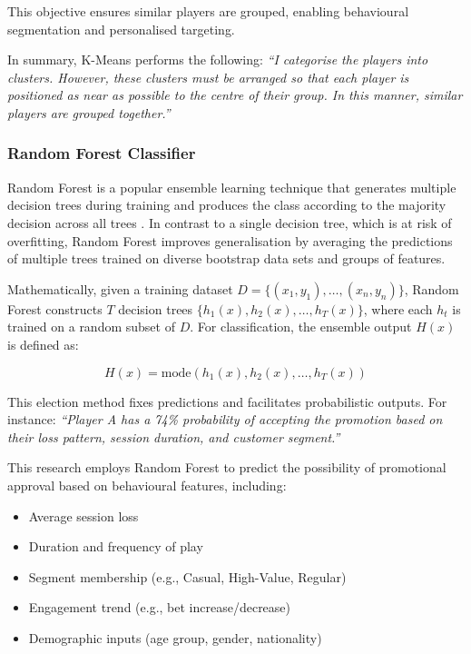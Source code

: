 \documentclass[12pt,a4paper]{report}
\begin{document}
This objective ensures similar players are grouped, enabling behavioural segmentation and personalised targeting.

In summary, K-Means performs the following:
\textit{``I categorise the players into clusters. However, these clusters must be arranged so that each player is positioned as near as possible to the centre of their group. In this manner, similar players are grouped together.''}


\subsubsection{Random Forest Classifier}

Random Forest is a popular ensemble learning technique that generates multiple decision trees during training and produces the class according to the majority decision across all trees \citet{randomforest}.  In contrast to a single decision tree, which is at risk of overfitting, Random Forest improves generalisation by averaging the predictions of multiple trees trained on diverse bootstrap data sets and groups of features.

Mathematically, given a training dataset \( D = \{(x_1, y_1), \dots, (x_n, y_n)\} \), Random Forest constructs \( T \) decision trees \( \{h_1(x), h_2(x), \dots, h_T(x)\} \), where each \( h_t \) is trained on a random subset of \( D \). For classification, the ensemble output \( H(x) \) is defined as:

\[
H(x) = \text{mode}\left( h_1(x), h_2(x), \dots, h_T(x) \right)
\]

This election method fixes predictions and facilitates probabilistic outputs. For instance:  
\textit{``Player A has a 74\% probability of accepting the promotion based on their loss pattern, session duration, and customer segment.''}

This research employs Random Forest to predict the possibility of promotional approval based on behavioural features, including:

\begin{itemize}
    \item Average session loss
    \item Duration and frequency of play
    \item Segment membership (e.g., Casual, High-Value, Regular)
    \item Engagement trend (e.g., bet increase/decrease)
    \item Demographic inputs (age group, gender, nationality)
\end{itemize}
\end{document}
